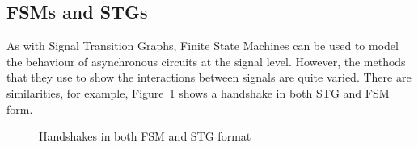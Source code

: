 \subsection{FSMs and STGs \label{sub:FSMs-STGs}}

As with Signal Transition Graphs, Finite State Machines can be used to model the behaviour of asynchronous circuits at the signal level. However,
the methods that they use to show the interactions between signals are quite varied. There are similarities, for example, Figure~\ref{fig:handshakes-all}
shows a handshake in both STG and FSM form.

\begin{figure}[H]
  \caption{\label{fig:handshakes-all} Handshakes in both FSM and STG format}
\end{figure}

